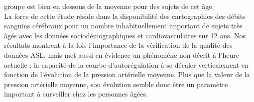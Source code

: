 groupe est bien en dessous de la moyenne pour des sujets de cet âge.\\
La force de cette étude réside dans la disponibilité des cartographies des débits sanguins
cérébraux pour un nombre inhabituellement important de sujets très âgés avec les données
sociodémographiques et cardiovasculaires sur 12 ans. Nos résultats montrent à la fois l’importance de
la vérification de la qualité des données ASL, mais met aussi en évidence un phénomène non décrit à
l’heure actuelle : la capacité de la courbe d’autorégulation à se décaler verticalement en fonction de l’évolution de la pression artérielle moyenne. Plus que la valeur de la pression artérielle moyenne, son
évolution semble donc être un paramètre important à surveiller chez les personnes âgées.

































{}
